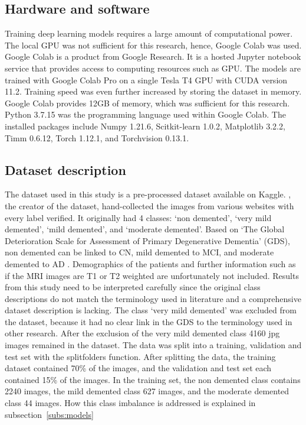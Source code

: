 \documentclass[11pt, a4paper]{article}
\begin{document}
\subsection{Hardware and software} \label{subs:ware} 
Training deep learning models requires a large amount of computational power. The local GPU was not sufficient for this research, hence, Google Colab was used. Google Colab is a product from Google Research. It is a hosted Jupyter notebook service that provides access to computing resources such as GPU. The models are trained with Google Colab Pro on a single Tesla T4 GPU with CUDA version 11.2. Training speed was even further increased by storing the dataset in memory. Google Colab provides 12GB of memory, which was sufficient for this research. Python 3.7.15 was the programming language used within Google Colab. The installed packages include Numpy 1.21.6, Scitkit-learn 1.0.2, Matplotlib 3.2.2, Timm 0.6.12, Torch 1.12.1, and Torchvision 0.13.1.

\subsection{Dataset description} \label{subs:dataset} 
The dataset used in this study is a pre-processed dataset available on Kaggle. \citeauthor{Dubey2019AlzheimersImages}, the creator of the dataset, hand-collected the images from various websites with every label verified. It originally had 4 classes: ‘non demented’, ‘very mild demented’, ‘mild demented’, and ‘moderate demented’. Based on ‘The Global Deterioration Scale for Assessment of Primary Degenerative Dementia’ (GDS), non demented can be linked to CN, mild demented to MCI, and moderate demented to AD \citep{Reisberg1982TheDementia}. Demographics of the patients and further information such as if the MRI images are T1 or T2 weighted are unfortunately not included. Results from this study need to be interpreted carefully since the original class descriptions do not match the terminology used in literature and a comprehensive dataset description is lacking. The class ‘very mild demented’ was excluded from the dataset, because it had no clear link in the GDS to the terminology used in other research. After the exclusion of the very mild demented class 4160 jpg images remained in the dataset. The data was split into a training, validation and test set with the splitfolders function. After splitting the data, the training dataset contained 70\% of the images, and the validation and test set each contained 15\% of the images. In the training set, the non demented class contains 2240 images, the mild demented class 627 images, and the moderate demented class 44 images. How this class imbalance is addressed is explained in subsection~\ref{subs:models}
\end{document}
